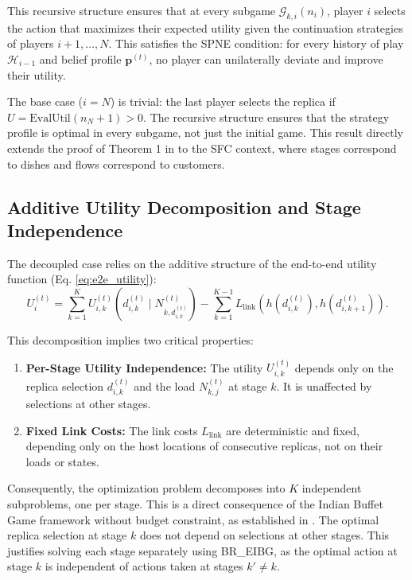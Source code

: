 \documentclass[journal]{IEEEtran}
\theoremstyle{plain}
\theoremstyle{definition}
\theoremstyle{remark}
\begin{document}
This recursive structure ensures that at every subgame $\mathcal{G}_{k,i}(n_i)$, player $i$ selects the action that maximizes their expected utility given the continuation strategies of players $i+1, \dots, N$. This satisfies the SPNE condition: for every history of play $\mathcal{H}_{i-1}$ and belief profile $\mathbf{p}^{(t)}$, no player can unilaterally deviate and improve their utility.

The base case ($i = N$) is trivial: the last player selects the replica if $U = \text{EvalUtil}(n_N + 1) > 0$. The recursive structure ensures that the strategy profile is optimal in every subgame, not just the initial game. This result directly extends the proof of Theorem 1 in \cite{jiang2015indian} to the SFC context, where stages correspond to dishes and flows correspond to customers.

\subsection{Additive Utility Decomposition and Stage Independence}
\label{app:proof_thm1_sec2}

The decoupled case relies on the additive structure of the end-to-end utility function (Eq. \eqref{eq:e2e_utility}):
\begin{equation}
U_i^{(t)} = \sum_{k=1}^{K} U_{i,k}^{(t)}(d_{i,k}^{(t)} \mid N_{k,d_{i,k}^{(t)}}^{(t)}) - \sum_{k=1}^{K-1} L_{\text{link}}(h(d_{i,k}^{(t)}), h(d_{i,k+1}^{(t)})).
\end{equation}

This decomposition implies two critical properties:
\begin{enumerate}
    \item \textbf{Per-Stage Utility Independence:} The utility $U_{i,k}^{(t)}$ depends only on the replica selection $d_{i,k}^{(t)}$ and the load $N_{k,j}^{(t)}$ at stage $k$. It is unaffected by selections at other stages.
    \item \textbf{Fixed Link Costs:} The link costs $L_{\text{link}}$ are deterministic and fixed, depending only on the host locations of consecutive replicas, not on their loads or states.
\end{enumerate}

Consequently, the optimization problem decomposes into $K$ independent subproblems, one per stage. This is a direct consequence of the Indian Buffet Game framework without budget constraint, as established in \cite{jiang2015indian, section III}. The optimal replica selection at stage $k$ does not depend on selections at other stages. This justifies solving each stage separately using \textsf{BR\_EIBG}, as the optimal action at stage $k$ is independent of actions taken at stages $k' \neq k$.
\end{document}
